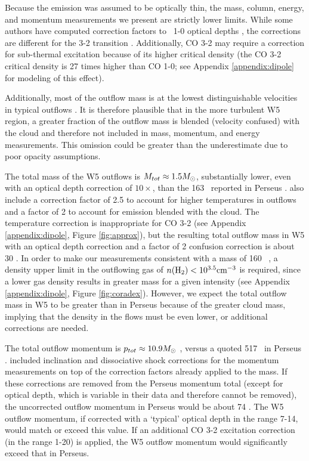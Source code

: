 Because the emission was assumed to be optically thin, the mass, column,
energy, and momentum measurements we present are strictly lower limits.  While
some authors have computed correction factors to \twelveco\ 1-0 optical depths
\citep[e.g.][]{Cabrit1990},  the corrections are different for the 3-2
transition \citep[1.8 to 14.3,][]{curtis2010}.  Additionally, CO 3-2 may
require a correction for sub-thermal excitation because of its higher critical
density (the CO 3-2 critical density is 27 times higher than CO 1-0; see
Appendix \ref{appendix:dipole} for modeling of this effect).

Additionally, most of the outflow mass is at the lowest distinguishable
velocities in typical outflows \citep[e.g.][]{arce2010}.  It is therefore
plausible that in the more turbulent W5 region, a greater fraction of the
outflow mass is blended (velocity confused) with the cloud and therefore not
included in mass, momentum, and energy measurements.  This omission could be
greater than the underestimate due to poor opacity assumptions.

The total mass of the W5 outflows is $M_{tot}\approx1.5 M_{\odot}$,
substantially lower, even with an optical depth correction of $10\times$, than
the 163 \msun\ reported in Perseus \citep{arce2010}.  \citet{arce2010} also include
a correction factor of 2.5 to account for higher temperatures in outflows and a
factor of 2 to account for emission blended with the cloud.  The temperature
correction is inappropriate for CO 3-2 (see Appendix \ref{appendix:dipole},
Figure \ref{fig:approx}), but the resulting total outflow mass in W5 with an
optical depth correction and a factor of 2 confusion correction is about 30
\msun.  In order to make our measurements consistent with a mass of 160 \msun\ , a density
upper limit in the outflowing gas of $n(\textrm{H}_{2}) < 10^{3.5} \textrm{cm}^{-3}$ is required,
since a lower gas density results in greater mass for a given intensity (see
Appendix \ref{appendix:dipole}, Figure \ref{fig:coradex}).  However, we
expect the total outflow mass in W5 to be greater than in Perseus because 
of the greater cloud mass, implying that the density in the flows must be even
lower, or additional corrections are needed.

The total outflow momentum is $p_{tot}\approx10.9 M_{\odot}$ \kms, versus a quoted
517 \msun \kms\ in Perseus \citep{arce2010}.  \citet{arce2010} included
inclination and dissociative shock corrections for the momentum measurements
on top of the correction factors already applied to the mass.  If these
corrections are removed from the Perseus momentum total (except for optical depth,
which is variable in their data and therefore cannot be removed), the uncorrected outflow
momentum in Perseus would be about 74 \msun \kms. The W5 outflow momentum, if
corrected with a `typical' optical depth in the range 7-14, would match or exceed
this value.  If an additional CO 3-2 excitation correction (in the range 1-20)
is applied, the W5 outflow momentum would significantly exceed that in Perseus.

